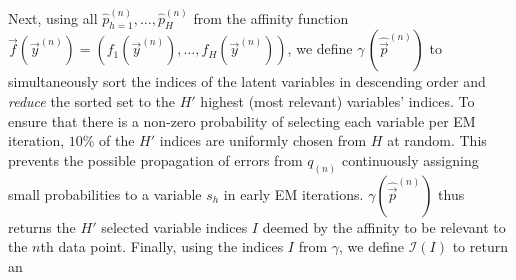 %
Next, using all $\hat{p}_{h=1}^{(n)},\dots, \hat{p}_H^{(n)}$  
from the affinity function 
$\vec{f}(\vec{y}^{(n)}) = (f_1(\vec{y}^{(n)}), \dots, f_H(\vec{y}^{(n)}))$, we define 
 $\gamma\,(\hat{\vec{p}}^{(n)})$ to simultaneously sort the indices of the latent variables in descending order  and \textit{reduce} the sorted set to the $H'$ highest (most relevant) variables' indices. %
To ensure that there is a non-zero probability of selecting each variable per EM iteration, $10\%$ of the $H'$ indices are uniformly chosen from $H$ at random. 
This prevents the possible propagation of errors from $q_{(n)}$ continuously assigning small probabilities to a variable $s_h$ in early EM
iterations. 
%
$\gamma(\hat{\vec{p}}^{(n)})$ thus returns the $H'$ selected variable indices $I$ deemed by the affinity to be relevant to the $n$th data point.
%
%
%
Finally, using the indices $I$ from $\gamma$, we define $\mathcal{I}(I)$ to return an 

